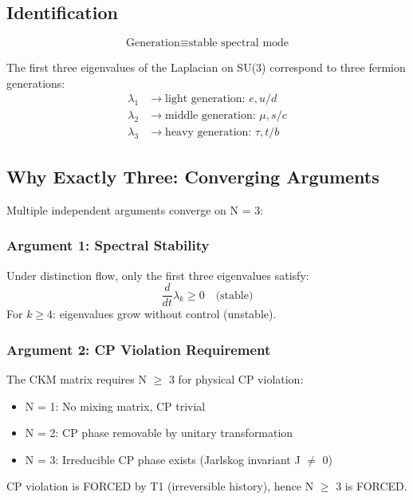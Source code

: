 \subsection{Identification}

\begin{definition}[Generation]
\begin{equation}
\text{Generation} \equiv \text{stable spectral mode}
\end{equation}
\end{definition}

\begin{theorem}
The first three eigenvalues of the Laplacian on SU(3) correspond to three fermion generations:
\begin{align}
\lambda_1 &\to \text{light generation: } e, u/d \\
\lambda_2 &\to \text{middle generation: } \mu, s/c \\
\lambda_3 &\to \text{heavy generation: } \tau, t/b
\end{align}
\end{theorem}

\subsection{Why Exactly Three: Converging Arguments}

Multiple independent arguments converge on N = 3:

\subsubsection{Argument 1: Spectral Stability}

\begin{theorem}
Under distinction flow, only the first three eigenvalues satisfy:
\begin{equation}
\frac{d}{dt}\lambda_k \geq 0 \quad \text{(stable)}
\end{equation}
For $k \geq 4$: eigenvalues grow without control (unstable).
\end{theorem}

\subsubsection{Argument 2: CP Violation Requirement}

The CKM matrix requires N $\geq$ 3 for physical CP violation:
\begin{itemize}
    \item N = 1: No mixing matrix, CP trivial
    \item N = 2: CP phase removable by unitary transformation
    \item N = 3: Irreducible CP phase exists (Jarlskog invariant J $\neq$ 0)
\end{itemize}
CP violation is FORCED by T1 (irreversible history), hence N $\geq$ 3 is FORCED.

